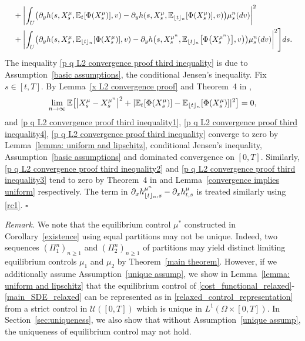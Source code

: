 \documentclass[12pt]{article}
\DeclareMathOperator*{\argmax}{arg\,max}
\DeclarePairedDelimiter\floor{\lfloor}{\rfloor}
\theoremstyle{named}
\numberwithin{equation}{section}
\newcommand{\abs}[1]{\lvert#1\rvert}
\newenvironment{Proof}{\removelastskip\par\medskip \noindent{\em Proof.} \rm}{\penalty-20\null\hfill$\square$\par\medbreak}
\newcommand{\E}{\mathbb{E}}
\newcommand{\real}{\mathbb{R}}
\let\oldcitet=\citet
\renewcommand{\cite}[1]{\textcolor[rgb]{0,0,1}{\oldcitet{#1}}}
\renewcommand{\citet}[1]{\textcolor[rgb]{0,0,1}{\oldcitet{#1}}}
\begin{document}
\begin{Proof}
\begin{align}
      \\
        &\quad
        + \biggl| \int_U \bigl( \partial_yh(s, X^{{\mu}}_s, \mathbb{E}_t [\Phi(X^{{\mu}}_s)], v) - \partial_yh(s, X^{{\mu}}_s, \mathbb{E}_{\floor{t}_{n}} [\Phi(X^{{\mu}}_s)], v)  \bigr) {\mu}^n _s(dv)\biggr|^2
        \label{p q L2 convergence proof third inequality4}
        \\
        &\quad
        +\biggl| \int_U \bigl( \partial_yh(s, X^{{\mu}}_s, \mathbb{E}_{\floor{t}_{n}} [\Phi(X^{{\mu}}_s)], v) - \partial_yh\big(s, X^{{\mu}^n }_s, \mathbb{E}_{\floor{t}_{n}} \big[\Phi\big(X^{{\mu}^n }_s\big)\big], v\big)  \bigr) {\mu}^n _s(dv)\biggr|^2
        \Biggr] ds.
  \label{p q L2 convergence proof third inequality}
\end{align}
The inequality \eqref{p q L2 convergence proof third inequality} is due to Assumption~\ref{basic assumptions}, the conditional Jensen's inequality.
Fix $s \in [t,T]$.
By Lemma~\ref{x L2 convergence proof} and Theorem~4 in \cite{fetter1977continuity},
\begin{equation*}
    \lim_{{n}\to \infty} \E\big[
    \big| X^{{\mu}}_s - X^{{\mu}^n }_s\big|^2 + \abs{\mathbb{E}_t [\Phi(X^{{\mu}}_s)] - \mathbb{E}_{\floor{t}_{n}} [\Phi(X^{{\mu}}_s)]}^2 \big] = 0,
\end{equation*}
and
\eqref{p q L2 convergence proof third inequality1},
\eqref{p q L2 convergence proof third inequality4},
\eqref{p q L2 convergence proof third inequality}
converge to zero
by Lemma~\ref{lemma: uniform and lipschitz}, conditional Jensen's inequality, Assumption~\ref{basic assumptions} and dominated convergence on $[0,T]$.
Similarly,
\eqref{p q L2 convergence proof third inequality2} and
\eqref{p q L2 convergence proof third inequality3}
tend to zero by Theorem~4 in \cite{fetter1977continuity} and  Lemma~\ref{convergence implies uniform} respectively.
The term in $\partial_xh^{{\mu}^n }_{\floor{t}_{n},s} - \partial_xh^{{\mu}}_{t,s}$
is treated similarly using \eqref{rc1}.
\end{Proof}
\noindent
\noindent
{\em Remark.}
We note that the equilibrium control $\mu^*$
constructed in Corollary~\ref{existence}
using equal partitions may not be unique.
Indeed, two sequences $(\Pi_1^n)_{n\geq 1}$ and $(\Pi_2^n)_{n\geq 1}$
of partitions may yield distinct limiting equilibrium
controls $\mu_1$ and $\mu_2$
by Theorem~\ref{main theorem}.
 However, if we additionally assume Assumption~\ref{unique assump},
we show in Lemma~\ref{lemma: uniform and lipschitz} that
the equilibrium control of
\eqref{cost_functional_relaxed}-\eqref{main_SDE_relaxed}
 can be represented as in \eqref{relaxed_control_representation}
from a strict control in $\mathcal{U}([0,T])$
which is unique in $L^1(\Omega \times [0,T])$.
In Section~\ref{sec:uniqueness},
we also show that without Assumption~\ref{unique assump},
the uniqueness of equilibrium control may not hold.
\end{document}

